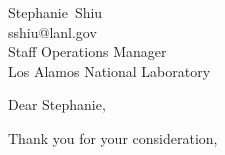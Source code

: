 \documentclass[10pt,letter]{letter}
\makeatletter
\def\firstname{Stephanie}
\def\lastname{Shiu}
\def\hm{\firstname\ \lastname} %
\def\hremail{sshiu@lanl.gov}
\def\position{Staff Operations Manager} %
\def\company{Los Alamos National Laboratory} %
\makeatother
\begin{document}
\begin{letter}{\hm \\ \hremail \\ \position \\ \company}

\opening{Dear \firstname,}

\setlength\parindent{.5in}



 

\closing{Thank you for your consideration,}
\end{letter}
\end{document}
